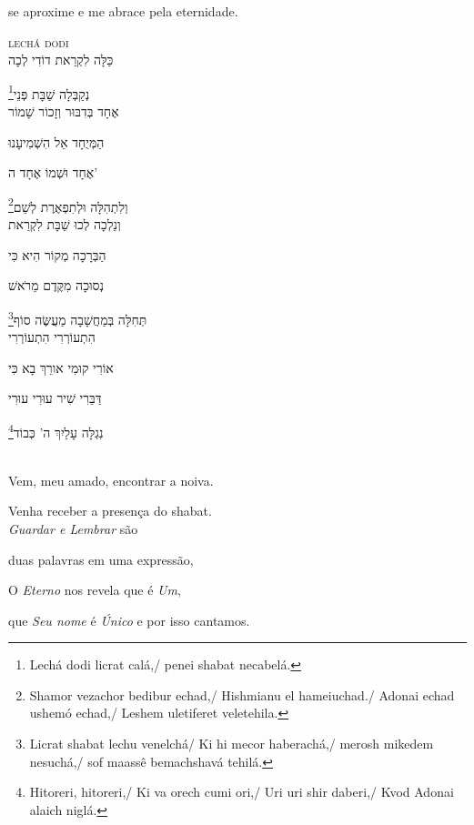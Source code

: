 se aproxime e me abrace pela eternidade.

\movetoevenpage
\raggedleft

\textsc{lechá dodi}\\[15pt]

כַּלָּה לִקְרַאת דוֹדִי לְכָה

נְקַבְּלָה שַׁבָּת פְּנֵי\footnote{Lechá dodi licrat calá,/ penei shabat necabelá.}\\[10pt]

אֶחָד בְּדִבּוּר וְזָכוֹר שָׁמוֹר

הַמְּיֻחָד אֵל הִשְׁמִיעָנוּ

אֶחָד וּשְׁמוֹ אֶחָד ה' 

וְלִתְהִלָּה וּלְתִפְאֶרֶת לְשֵׁם\footnote{Shamor vezachor bedibur echad,/ Hishmianu el hameiuchad./ Adonai echad ushemó echad,/ Leshem uletiferet veletehila.}\\[10pt]

וְנֵלְכָה לְכוּ שַׁבָּת לִקְרַאת

הַבְּרָכָה מְקוֹר הִיא כִּי

נְסוּכָה מִקֶּדֶם מֵרֹאשׁ 

תְּחִלָּה בְּמַחֲשָׁבָה מַעֲשֶּׂה סוֹף\footnote{Licrat shabat lechu venelchá/ Ki hi mecor haberachá,/ merosh mikedem nesuchá,/ sof maassê bemachshavá tehilá.}\\[10pt]

הִתְעוֹרְרִי הִתְעוֹרְרִי

אוֹרִי קוּמִי אורֵךְ בָא כִּי

דַּבֵּרִי שִׁיר עוּרִי עוּרִי

נִגְלָּה עָלַיִךְ ה' כְּבוֹד\footnote{Hitoreri, hitoreri,/ Ki va orech cumi ori,/ Uri uri shir daberi,/
Kvod Adonai alaich niglá.}\\[10pt]

\movetooddpage
\raggedright

\textsc{}\\[15pt]

Vem, meu amado, encontrar a noiva.

Venha receber a presença do shabat.\\[10pt]

\emph{Guardar e Lembrar} são

duas palavras em uma expressão,

O \emph{Eterno} nos revela que é \emph{Um},

que \emph{Seu nome} é \emph{Único} e por isso cantamos.\\[10pt]

